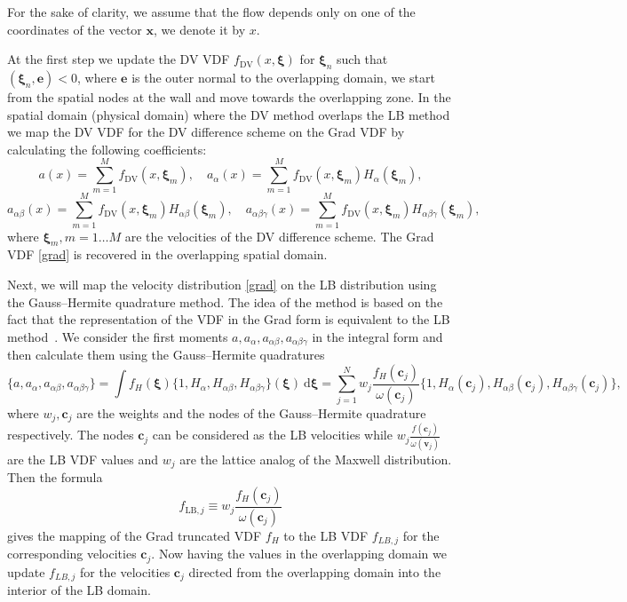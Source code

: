 \documentclass{aip-cp}
\newcommand{\dd}{\mathrm{d}}
\newcommand{\dxi}{\:\boldsymbol{\dd\xi}}
\newcommand{\bxi}{\boldsymbol{\xi}}
\newcommand{\bv}{\boldsymbol{v}}
\newcommand{\bc}{\boldsymbol{c}}
\newcommand{\bx}{\boldsymbol{x}}
\begin{document}
For the sake of clarity, we assume that the flow depends only on one of the coordinates of the vector $\bx$, we denote it by $x$.

At the first step we update the DV VDF $f_\mathrm{DV}(x,\bxi)$ for $\bxi_n$ such that $(\bxi_n,\mathbf{e})<0$,
where $\mathbf{e}$ is the outer normal to the overlapping domain,
we start from the spatial nodes at the wall and move towards the overlapping zone.
In the spatial domain (physical domain) where the DV method overlaps the LB method we map the DV VDF
for the DV difference scheme on the Grad VDF by calculating the following coefficients:
$$
a(x)=\sum_{m=1}^M f_\mathrm{DV}(x,\bxi_m), \quad a_\alpha(x)=\sum_{m=1}^Mf_\mathrm{DV}(x,\bxi_m)H_\alpha(\bxi_m),
$$
$$
a_{\alpha\beta }(x)=\sum_{m=1}^Mf_\mathrm{DV}(x,\bxi_m)H_{\alpha\beta}(\bxi_m), \quad
a_{\alpha\beta \gamma}(x)=\sum_{m=1}^Mf_\mathrm{DV}(x,\bxi_m)H_{\alpha\beta \gamma}(\bxi_m),
$$
where $\bxi_m, m=1 \ldots M$ are the velocities of the DV difference scheme.
The Grad VDF \eqref{grad} is recovered in the overlapping spatial domain.

Next, we will map the velocity distribution \eqref{grad} on the LB distribution using the Gauss--Hermite quadrature method.
The idea of the method is based on the fact that the representation of the VDF in the Grad form
is equivalent to the LB method~\cite{He1997, Shan1998}.
We consider the first moments $a,a_{\alpha},a_{\alpha\beta}, a_{\alpha\beta \gamma}$ in the integral form
and then calculate them using the Gauss--Hermite quadratures
$$
\{ a, a_{\alpha}, a_{\alpha\beta}, a_{\alpha\beta\gamma} \} =
    \int f_H(\bxi)\{ 1, H_{\alpha}, H_{\alpha\beta}, H_{\alpha\beta\gamma} \}(\bxi)\dxi =
    \sum_{j=1}^N w_j\frac{f_H(\boldsymbol{c}_j)}{\omega(\bc_j)}
    \{1, H_{\alpha}(\bc_j), H_{\alpha\beta}(\bc_j), H_{\alpha\beta\gamma}(\bc_j) \},
$$
where $w_j, \boldsymbol{c}_j$ are the weights and the nodes of the Gauss--Hermite quadrature respectively.
The nodes $\bc_j$ can be considered as the LB velocities
while $ w_j\frac{f(\bc_j)}{\omega(\bv_j)}$ are the LB VDF values
and $w_j$ are the lattice analog of the Maxwell distribution.
Then the formula
\begin{equation}\label{grad_to_latt}
    f_{\mathrm{LB},j}\equiv w_j\frac{f_H(\bc_j)}{\omega(\bc_j)}
\end{equation}
gives the mapping of the Grad truncated VDF $f_H$ to the LB VDF $f_{LB,j}$ for the corresponding velocities $\bc_j$.
Now having the values in the overlapping domain we update $f_{LB,j}$ for the velocities $\bc_j$
directed from the overlapping domain into the interior of the LB domain.
\end{document}
